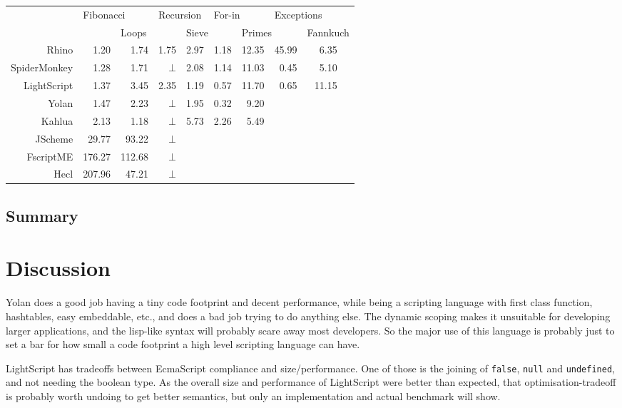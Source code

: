 \documentclass[11pt]{report}
\begin{document}
\begin{center} \begin{tabular}{|r|r|r|r|r|r|r|r|rr|} \hline 
& \multicolumn{2}{|l|}{Fibonacci} & \multicolumn{2}{|l|}{Recursion} & \multicolumn{2}{|l|}{For-in} & \multicolumn{2}{|l}{Exceptions} & \\
& & \multicolumn{2}{|l|}{Loops} & \multicolumn{2}{|l|}{Sieve} & \multicolumn{2}{|l|}{Primes} & \multicolumn{2}{|l|}{Fannkuch} \\
\hline Rhino       & 1.20 & 1.74 & 1.75   & 2.97 & 1.18 & 12.35 & 45.99 & 6.35 & \\ 
\hline SpiderMonkey& 1.28 & 1.71 & $\bot$ & 2.08 & 1.14 & 11.03 & 0.45  & 5.10 & \\ 
\hline LightScript & 1.37 & 3.45 & 2.35   & 1.19 & 0.57 & 11.70 & 0.65  & 11.15 & \\
\hline Yolan       & 1.47 & 2.23 & $\bot$ & 1.95 & 0.32 &  9.20 &  &  & \\
\hline Kahlua      & 2.13 & 1.18 & $\bot$ &  5.73 & 2.26 & 5.49 &  &  & \\ 
\hline JScheme    & 29.77 & 93.22 & $\bot$ & & & & & & \\ 
\hline FscriptME & 176.27 & 112.68& $\bot$ & & & & & & \\ 
\hline Hecl      & 207.96 & 47.21 & $\bot$ & & & & & & \\ 
\hline \end{tabular}
\end{center} 

\section{Summary}
\chapter{Discussion}
\label{discussion}


Yolan does a good job having a tiny code footprint and decent performance, while being a scripting language with first class function, hashtables, easy embeddable, etc., and does a bad job trying to do anything else.
The dynamic scoping makes it unsuitable for developing larger applications, and the lisp-like syntax will probably scare away most developers.
So the major use of this language is probably just to set a bar for how small a code footprint a high level scripting language can have.

LightScript has tradeoffs between EcmaScript compliance and size/performance. 
One of those is the joining of \verb|false|, \verb|null| and \verb|undefined|, and not needing the boolean type.
As the overall size and performance of LightScript were better than expected,
that optimisation-tradeoff is probably worth undoing to get better semantics, 
but only an implementation and actual benchmark will show. 
\end{document}
